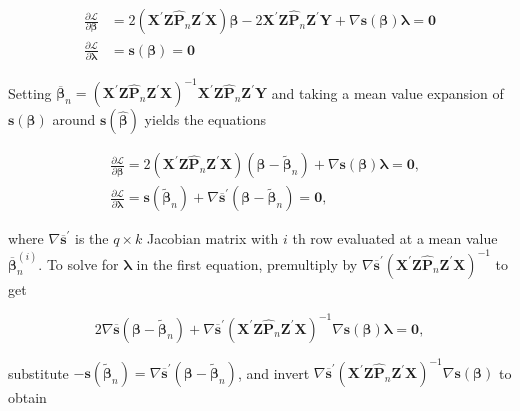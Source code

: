 \documentclass[10pt]{article}
\begin{document}
$$
\begin{aligned}
\frac{\partial \mathcal{L}}{\partial \boldsymbol{\beta}} & =2\left(\mathbf{X}^{\prime} \mathbf{Z} \hat{\mathbf{P}}_{n} \mathbf{Z}^{\prime} \mathbf{X}\right) \boldsymbol{\beta}-2 \mathbf{X}^{\prime} \mathbf{Z} \hat{\mathbf{P}}_{n} \mathbf{Z}^{\prime} \mathbf{Y}+\nabla \mathbf{s}(\boldsymbol{\beta}) \boldsymbol{\lambda}=\mathbf{0} \\
\frac{\partial \mathcal{L}}{\partial \boldsymbol{\lambda}} & =\mathbf{s}(\boldsymbol{\beta})=\mathbf{0}
\end{aligned}
$$

Setting $\overline{\boldsymbol{\beta}}_{n}=\left(\mathbf{X}^{\prime} \mathbf{Z} \hat{\mathbf{P}}_{n} \mathbf{Z}^{\prime} \mathbf{X}\right)^{-1} \mathbf{X}^{\prime} \mathbf{Z} \hat{\mathbf{P}}_{n} \mathbf{Z}^{\prime} \mathbf{Y}$ and taking a mean value expansion of $\mathbf{s}(\boldsymbol{\beta})$ around $\mathbf{s}(\hat{\boldsymbol{\beta}})$ yields the equations

$$
\begin{aligned}
& \frac{\partial \mathcal{L}}{\partial \boldsymbol{\beta}}=2\left(\mathbf{X}^{\prime} \mathbf{Z} \hat{\mathbf{P}}_{n} \mathbf{Z}^{\prime} \mathbf{X}\right)\left(\boldsymbol{\beta}-\tilde{\boldsymbol{\beta}}_{n}\right)+\nabla \mathbf{s}(\boldsymbol{\beta}) \boldsymbol{\lambda}=\mathbf{0}, \\
& \frac{\partial \mathcal{L}}{\partial \boldsymbol{\lambda}}=\mathbf{s}\left(\tilde{\boldsymbol{\beta}}_{n}\right)+\nabla \overline{\mathbf{s}}^{\prime}\left(\boldsymbol{\beta}-\tilde{\boldsymbol{\beta}}_{n}\right)=\mathbf{0},
\end{aligned}
$$

where $\nabla \overline{\mathbf{s}}^{\prime}$ is the $q \times k$ Jacobian matrix with $i$ th row evaluated at a mean value $\overline{\boldsymbol{\beta}}_{n}^{(i)}$. To solve for $\boldsymbol{\lambda}$ in the first equation, premultiply by $\nabla \overline{\mathbf{s}}^{\prime}\left(\mathbf{X}^{\prime} \mathbf{Z}\right. \left.\hat{\mathbf{P}}_{n} \mathbf{Z}^{\prime} \mathbf{X}\right)^{-1}$ to get

$$
2 \nabla \overline{\mathbf{s}}\left(\boldsymbol{\beta}-\tilde{\boldsymbol{\beta}}_{n}\right)+\nabla \overline{\mathbf{s}}^{\prime}\left(\mathbf{X}^{\prime} \mathbf{Z} \hat{\mathbf{P}}_{n} \mathbf{Z}^{\prime} \mathbf{X}\right)^{-1} \nabla \mathbf{s}(\boldsymbol{\beta}) \boldsymbol{\lambda}=\mathbf{0},
$$

substitute $-\mathbf{s}\left(\tilde{\boldsymbol{\beta}}_{n}\right)=\nabla \overline{\mathbf{s}}^{\prime}\left(\boldsymbol{\beta}-\tilde{\boldsymbol{\beta}}_{n}\right)$, and invert $\nabla \overline{\mathbf{s}}^{\prime}\left(\mathbf{X}^{\prime} \mathbf{Z} \hat{\mathbf{P}}_{n} \mathbf{Z}^{\prime} \mathbf{X}\right)^{-1} \nabla \mathbf{s}(\boldsymbol{\beta})$ to obtain
\end{document}
